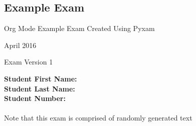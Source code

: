 \documentclass[12pt]{exam}
\begin{document}
    \begin{center}
        \section*{Example Exam}
    \end{center}
    \begin{center}
        Org Mode Example Exam Created Using Pyxam
    \end{center}
    \begin{center}
        April 2016
    \end{center}
    \begin{center}
        Exam Version 1
    \end{center}
    \textbf{Student First Name: \hrulefill} \\
    \textbf{Student Last Name: \hrulefill} \\
    \textbf{Student Number: \hrulefill} \\
    \\
    Note that this exam is comprised of randomly generated text
    \clearpage
\end{document}

